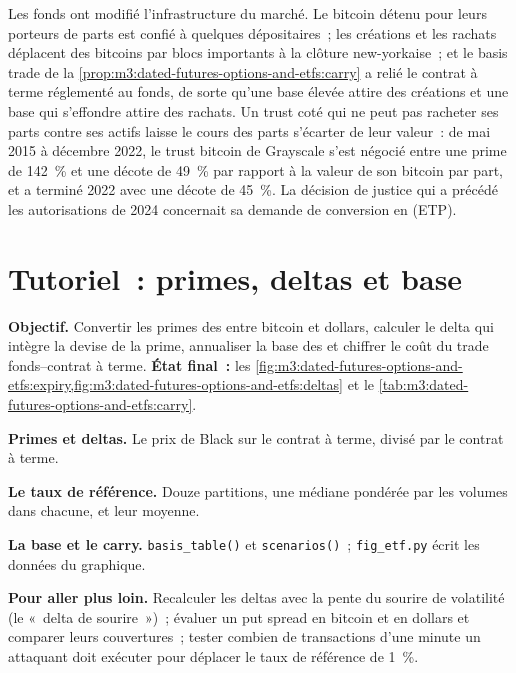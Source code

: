 Les fonds ont modifié l'infrastructure du marché. Le bitcoin détenu pour leurs porteurs de parts est confié à quelques dépositaires~; les créations et les rachats déplacent
des bitcoins par blocs importants à la clôture new-yorkaise~; et le basis trade de la \cref{prop:m3:dated-futures-options-and-etfs:carry} a relié le
contrat à terme réglementé au fonds, de sorte qu'une base élevée attire des créations et une base qui s'effondre attire des rachats. Un trust coté qui ne peut pas racheter ses parts
contre ses actifs laisse le cours des parts s'écarter de leur valeur~: de mai 2015 à décembre 2022, le trust bitcoin de Grayscale s'est négocié entre une
prime de 142~\% et une décote de 49~\% par rapport à la valeur de son bitcoin par part, et a terminé 2022 avec une décote de 45~\%. La décision de justice qui a précédé les
autorisations de 2024 concernait sa demande de conversion en  (ETP).

\section{Tutoriel~: primes, deltas et base}\label{tut:m3:dated-futures-options-and-etfs:convert}

\begin{tutorial}
\textbf{Objectif.} Convertir les primes des  entre bitcoin et dollars, calculer le delta qui intègre la devise de la prime, annualiser
la base des  et chiffrer le coût du trade fonds--contrat à terme. \textbf{État final~:}
les \cref{fig:m3:dated-futures-options-and-etfs:expiry,fig:m3:dated-futures-options-and-etfs:deltas} et
le \cref{tab:m3:dated-futures-options-and-etfs:carry}.
\begin{tutsteps}
\item \textbf{Primes et deltas.} Le prix de Black sur le contrat à terme, divisé par le contrat à terme.
\label{lst:m3:dated-futures-options-and-etfs:delta}
\item \textbf{Le taux de référence.} Douze partitions, une médiane pondérée par les volumes dans chacune, et leur moyenne.
\label{lst:m3:dated-futures-options-and-etfs:brr}
\item \textbf{La base et le carry.} \texttt{basis\_table()} et \texttt{scenarios()}~; \texttt{fig\_etf.py} écrit les données du graphique.
\end{tutsteps}
\textbf{Pour aller plus loin.} Recalculer les deltas avec la pente du sourire de volatilité (le «~delta de sourire~»)~; évaluer un put spread en bitcoin et en dollars
et comparer leurs couvertures~; tester combien de transactions d'une minute un attaquant doit exécuter pour déplacer le taux de référence de 1~\%.
\end{tutorial}

